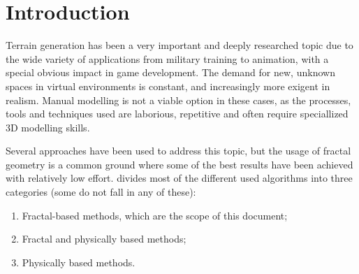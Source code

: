 \documentclass{acmtog}
\begin{document}
\begin{abstract} 
\end{abstract}



\section{Introduction}
Terrain generation has been a very important and deeply researched topic due to the wide variety of applications from military training to animation, with a special obvious impact in game development. The demand for new, unknown spaces in virtual environments is constant, and increasingly more exigent in realism. Manual modelling is not a viable option in these cases, as the processes, tools and techniques used are laborious, repetitive and often require speciallized 3D modelling skills.

Several approaches have been used to address this topic, but the usage of fractal geometry is a common ground where some of the best results have been achieved with relatively low effort. \cite{Belhadj07} divides most of the different used algorithms into three categories (some do not fall in any of these):
\begin{enumerate}
\item{Fractal-based methods, which are the scope of this document;}
\item{Fractal and physically based methods;}
\item{Physically based methods.}
\end{enumerate}
\end{document}
